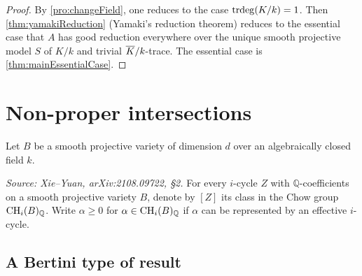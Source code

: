 \begin{proof}
  By \cref{pro:changeField}, one reduces to the case \(\operatorname{trdeg}(K/k)=1\).
  Then \cref{thm:yamakiReduction} (Yamaki's reduction theorem) reduces to the essential case
  that \(A\) has good reduction everywhere over the unique smooth projective model \(S\) of
  \(K/k\) and trivial \(\overline{K}/k\)-trace.
  The essential case is \cref{thm:mainEssentialCase}.
\end{proof}

\section{Non-proper intersections}
\label{sec:nonproper}

Let \(B\) be a smooth projective variety of dimension \(d\) over an algebraically closed
field \(k\).

\begin{definition}
  \label{def:ChowGroup}
  \uses{}
  \textit{Source: Xie--Yuan, arXiv:2108.09722, \S2.}
  For every \(i\)-cycle \(Z\) with \(\mathbb{Q}\)-coefficients on a smooth projective variety
  \(B\), denote by \([Z]\) its class in the Chow group \(\operatorname{CH}_i(B)_{\mathbb{Q}}\).
  Write \(\alpha \geq 0\) for \(\alpha \in \operatorname{CH}_i(B)_{\mathbb{Q}}\) if \(\alpha\) can be
  represented by an effective \(i\)-cycle.
\end{definition}

\subsection{A Bertini type of result}

